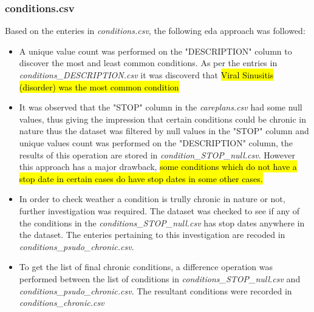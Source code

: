 \documentclass[12pt, twosided]{report}  %
\begin{document}
\subsubsection{conditions.csv}
Based on the enteries in \textit{conditions.csv}, the following eda approach was followed:
\begin{itemize}
	\item A unique value count was performed on the "DESCRIPTION" column to discover the most and least common conditions. As per the entries in \textit{conditions\_DESCRIPTION.csv} it was discoverd that \hl{Viral Sinusitis (disorder) was the most common condition}
	
	\item It was observed that the "STOP" column in the \textit{careplans.csv} had some null values, thus giving the impression that certain conditions could be chronic in nature thus the dataset was filtered by null values in the "STOP" column and unique values count was performed on the "DESCRIPTION" column, the results of this operation are stored in \textit{condition\_STOP\_null.csv}. However this approach has a major drawback, \hl{some conditions which do not have a stop date in certain cases do have stop dates in some other cases.} 
	
	\item In order to check weather a condition is trully chronic in nature or not, further investigation was required. The dataset was checked to see if any of the conditions in the \textit{conditions\_STOP\_null.csv} has stop dates anywhere in the dataset. The enteries pertaining to this investigation are recoded in \textit{conditions\_psudo\_chronic.csv}.
	
	\item To get the list of final chronic conditions, a difference operation was performed between the list of conditions in \textit{conditions\_STOP\_null.csv} and \textit{conditions\_psudo\_chronic.csv}. The resultant conditions were recorded in \textit{conditions\_chronic.csv}
\end{itemize}
\end{document}
